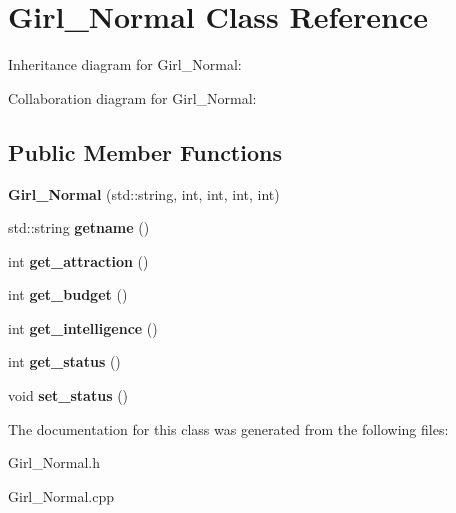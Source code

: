 \hypertarget{classGirl__Normal}{}\section{Girl\+\_\+\+Normal Class Reference}
\label{classGirl__Normal}


Inheritance diagram for Girl\+\_\+\+Normal\+:


Collaboration diagram for Girl\+\_\+\+Normal\+:
\subsection*{Public Member Functions}
\begin{DoxyCompactItemize}
\item 
{\bfseries Girl\+\_\+\+Normal} (std\+::string, int, int, int, int)\hypertarget{classGirl__Normal_ab1938aa91bebb25362c4f3e8a6d25444}{}\label{classGirl__Normal_ab1938aa91bebb25362c4f3e8a6d25444}

\item 
std\+::string {\bfseries getname} ()\hypertarget{classGirl__Normal_a627f1e24567292d04821ad6461cf1a18}{}\label{classGirl__Normal_a627f1e24567292d04821ad6461cf1a18}

\item 
int {\bfseries get\+\_\+attraction} ()\hypertarget{classGirl__Normal_a72909970f2327b41f7622aab844d150f}{}\label{classGirl__Normal_a72909970f2327b41f7622aab844d150f}

\item 
int {\bfseries get\+\_\+budget} ()\hypertarget{classGirl__Normal_ab6af08a0c17392ec5d8ce2117e73694e}{}\label{classGirl__Normal_ab6af08a0c17392ec5d8ce2117e73694e}

\item 
int {\bfseries get\+\_\+intelligence} ()\hypertarget{classGirl__Normal_a5f503907288796e6b38f5f8129c84ccd}{}\label{classGirl__Normal_a5f503907288796e6b38f5f8129c84ccd}

\item 
int {\bfseries get\+\_\+status} ()\hypertarget{classGirl__Normal_af36f1bcbd80d47075df6e30b8cc37ea3}{}\label{classGirl__Normal_af36f1bcbd80d47075df6e30b8cc37ea3}

\item 
void {\bfseries set\+\_\+status} ()\hypertarget{classGirl__Normal_a719e05d38135b1afef1ffbb6201a288e}{}\label{classGirl__Normal_a719e05d38135b1afef1ffbb6201a288e}

\end{DoxyCompactItemize}


The documentation for this class was generated from the following files\+:\begin{DoxyCompactItemize}
\item 
Girl\+\_\+\+Normal.\+h\item 
Girl\+\_\+\+Normal.\+cpp\end{DoxyCompactItemize}
